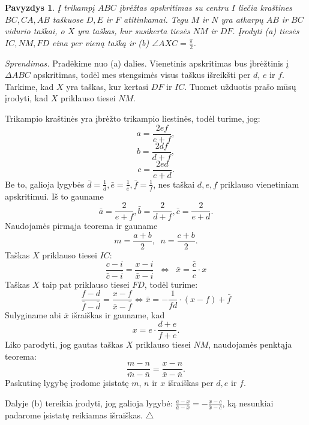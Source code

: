 \documentclass[11pt,a4paper,twoside]{book}
\newenvironment{sprendimas}{\noindent \textit{Sprendimas.}}{\hfill $\triangle$}
\newcounter{foo}[subsection]
\newtheorem{pavnr}[foo]{Pavyzdys}
\theoremstyle{definition} \newtheorem*{api}{Apibrėžimas}
\theoremstyle{remark} \newtheorem*{pastaba}{Pastaba}
\begin{document}
\begin{pavnr}
Į trikampį $ABC$ įbrėžtas apskritimas su centru $I$ liečia kraštines $BC, CA, AB$ taškuose $D, E$ ir $F$ atitinkamai. Tegu $M$ ir $N$ yra atkarpų $AB$ ir $BC$ vidurio taškai, o $X$ yra taškas, kur susikerta tiesės $NM$ ir $DF$. Įrodyti (a) tiesės $IC, NM, FD$ eina per vieną tašką ir (b) $\angle AXC = \frac{\pi}{2}$. 
\end{pavnr}

\begin{sprendimas}
Pradėkime nuo (a) dalies. Vienetinis apskritimas bus įbrėžtinis į $\Delta ABC$ apskritimas, todėl mes stengsimės visus taškus išreikšti per $d$, $e$ ir $f$. Tarkime, kad $X$ yra taškas, kur kertasi $DF$ ir $IC$. Tuomet užduotis prašo mūsų įrodyti, kad $X$ priklauso tiesei $NM$. 

Trikampio kraštinės yra įbrėžto trikampio liestinės, todėl turime, jog:
$$ a =\frac{2ef}{e+f},$$
$$ b=\frac{2df}{d+f},$$
$$ c=\frac{2ed}{e+d}.$$
Be to, galioja lygybės $\bar{d}= \frac{1}{d}, \bar{e}= \frac{1}{e}, \bar{f}= \frac{1}{f}$, nes taškai $d, e, f$ priklauso vienetiniam apskritimui. Iš to gauname
$$ \bar a =\frac{2}{e+f}, \bar b=\frac{2}{d+f}, \bar c=\frac{2}{e+d}.$$
Naudojamės pirmąja teorema ir gauname
$$ m=\frac{a+b}{2}, \phantom{a} n=\frac{c+b}{2}.$$
Taškas $X$ priklauso tiesei $IC$:
$$ \frac{c-i}{\bar{c}-\overline{i}}=\frac{x-i}{\bar{x} - \overline{i}} {\phantom{a}}\Leftrightarrow \phantom{a} \bar{x}= \frac{\bar{c}}{c}\cdot  x $$ 
Taškas $X$ taip pat priklauso tiesei $FD$, todėl turime:
$$\frac{f-d}{\bar{f}-\bar{d}}=\frac{x-f}{\bar{x} - \bar{f}} \Leftrightarrow \bar{x}= -\frac{1}{fd}\cdot  (x-f)+\bar{f} $$
Sulyginame abi $\bar{x}$ išraiškas ir gauname, kad 
$$ x = e \cdot \frac{d+e}{f+e}.$$
Liko parodyti, jog gautas taškas $X$ priklauso tiesei $NM$, naudojamės penktąja teorema:
$$ \frac{m-n}{\bar{m}-\bar{n}}=\frac{x-n}{\bar{x} - \bar{n}}.$$
Paskutinę lygybę įrodome įsistatę $m$, $n$ ir $x$ išraiškas per $d, e$ ir $f$.

Dalyje (b) tereikia įrodyti, jog galioja lygybė: $\frac{a-x}{\bar{a}-\bar{x}}= - \frac{x-c}{\bar{x} - \bar{c}}$, ką nesunkiai padarome įsistatę reikiamas išraiškas.
\end{sprendimas}
\end{document}
